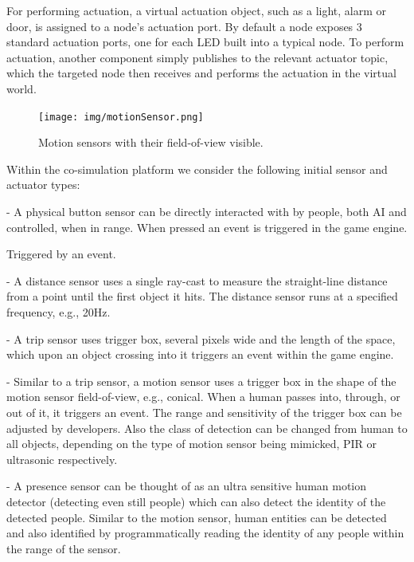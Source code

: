 For performing actuation, a virtual actuation object, such as a light, alarm or door, is assigned to a node's actuation port. By default a node exposes 3 standard actuation ports, one for each LED built into a typical node. To perform actuation, another component simply publishes to the relevant actuator topic, which the targeted node then receives and performs the actuation in the virtual world.

\begin{figure}[tbh]
  \centering
  \texttt{[image: img/motionSensor.png]}
  \caption{Motion sensors with their field-of-view visible.}
  \label{fig:motionSensor}
\end{figure}

Within the co-simulation platform we consider the following initial sensor and actuator types:
\begin{description}[topsep=0pt]
  \item [Button] - A physical button sensor can be directly interacted with by people, both AI and controlled, when in range. When pressed an event is triggered in the game engine.
    \begin{description}[topsep=0pt]
      \item[Type:] Triggered by an event. 
    \end{description}
  \item [Distance] - A distance sensor uses a single ray-cast to measure the straight-line distance from a point until the first object it hits. The distance sensor runs at a specified frequency, e.g., 20Hz.
  \item [Trip] - A trip sensor uses trigger box, several pixels wide and the length of the space, which upon an object crossing into it triggers an event within the game engine.
  \item [Motion] - Similar to a trip sensor, a motion sensor uses a trigger box in the shape of the motion sensor field-of-view, e.g., conical. When a human passes into, through, or out of it, it triggers an event. The range and sensitivity of the trigger box can be adjusted by developers. Also the class of detection can be changed from human to all objects, depending on the type of motion sensor being mimicked, PIR or ultrasonic respectively.
  \item [Presence] - A presence sensor can be thought of as an ultra sensitive human motion detector (detecting even still people) which can also detect the identity of the detected people. Similar to the motion sensor, human entities can be detected and also identified by programmatically reading the identity of any people within the range of the sensor. 

\end{description}
